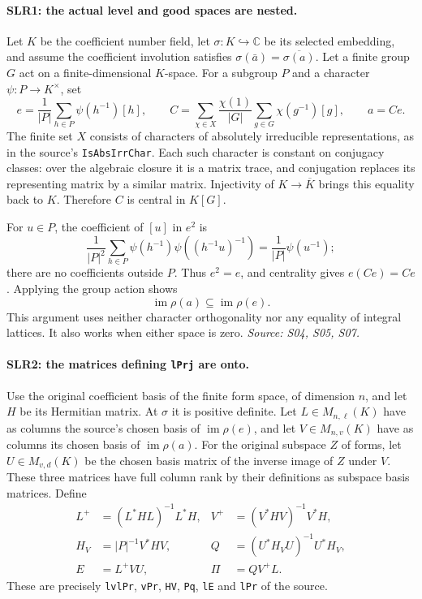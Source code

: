\paragraph{SLR1: the actual level and good spaces are nested.}
\label{claim:SLR1}
Let $K$ be the coefficient number field, let $\sigma:K\hookrightarrow
\mathbb C$ be its selected embedding, and assume the coefficient
involution satisfies $\sigma(\bar a)=\overline{\sigma(a)}$.  Let a
finite group $G$ act on a finite-dimensional $K$-space.  For a subgroup
$P$ and a character $\psi:P\to K^{\times}$, set
\[
 e=\frac1{|P|}\sum_{h\in P}\psi(h^{-1})[h],\qquad
 C=\sum_{\chi\in X}\frac{\chi(1)}{|G|}
                  \sum_{g\in G}\chi(g^{-1})[g],
 \qquad a=Ce.                                           \tag{SLR.2}
\]
The finite set $X$ consists of characters of absolutely irreducible
representations, as in the source's \texttt{IsAbsIrrChar}.  Each such
character is constant on conjugacy classes: over the algebraic closure
it is a matrix trace, and conjugation replaces its representing matrix
by a similar matrix.  Injectivity of $K\to\overline K$ brings this
equality back to $K$.  Therefore $C$ is central in $K[G]$.

For $u\in P$, the coefficient of $[u]$ in $e^2$ is
\[
 \frac1{|P|^2}\sum_{h\in P}
          \psi(h^{-1})\psi((h^{-1}u)^{-1})
       =\frac1{|P|}\psi(u^{-1});
\]
there are no coefficients outside $P$.  Thus $e^2=e$, and centrality
gives $e(Ce)=Ce$.  Applying the group action shows
\[
           \operatorname{im}\rho(a)\subseteq
                         \operatorname{im}\rho(e).       \tag{SLR.3}
\]
This argument uses neither character orthogonality nor any equality of
integral lattices.  It also works when either space is zero.
\emph{Source: S04, S05, S07.}

\paragraph{SLR2: the matrices defining \texttt{lPrj} are onto.}
\label{claim:SLR2}
Use the original coefficient basis of the finite form space, of
dimension $n$, and let $H$ be its Hermitian matrix.  At $\sigma$ it is
positive definite.  Let $L\in M_{n,\ell}(K)$ have as columns the source's
chosen basis of $\operatorname{im}\rho(e)$, and let
$V\in M_{n,v}(K)$ have as columns its chosen basis of
$\operatorname{im}\rho(a)$.  For the original subspace $Z$ of forms,
let $U\in M_{v,d}(K)$ be the chosen basis matrix of the inverse image
of $Z$ under $V$.  These three matrices have full column rank by their
definitions as subspace basis matrices.  Define
\[
 \begin{aligned}
 L^+&=(L^*HL)^{-1}L^*H,&
 V^+&=(V^*HV)^{-1}V^*H,\\
 H_V&=|P|^{-1}V^*HV,&
 Q&=(U^*H_VU)^{-1}U^*H_V,\\
 E&=L^+VU,& \Pi&=QV^+L.
 \end{aligned}                                             \tag{SLR.4}
\]
These are precisely \texttt{lvlPr}, \texttt{vPr}, \texttt{HV},
\texttt{Pq}, \texttt{lE} and \texttt{lPr} of the source.


